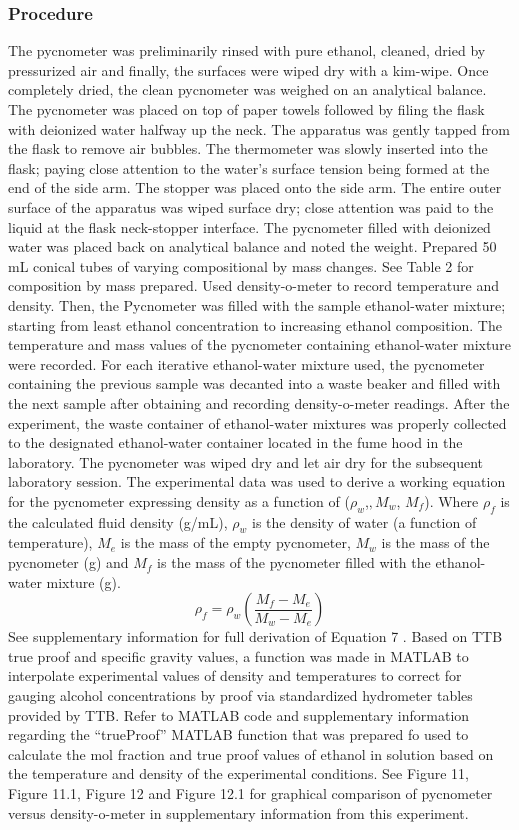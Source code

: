 \documentclass[peerreview, a4paper, 12pt]{IEEEtran}
\begin{document}
\subsubsection{\textbf{Procedure}}
The pycnometer was preliminarily rinsed with pure ethanol, cleaned, dried by pressurized air and finally, the surfaces were wiped dry with a kim-wipe. Once completely dried, the clean pycnometer was weighed on an analytical balance. The pycnometer was placed on top of paper towels followed by filing the flask with deionized water halfway up the neck. The apparatus was gently tapped from the flask to remove air bubbles. The thermometer was slowly inserted into the flask; paying close attention to the water’s surface tension being formed at the end of the side arm. The stopper was placed onto the side arm. The entire outer surface of the apparatus was wiped surface dry; close attention was paid to the liquid at the flask neck-stopper interface. The pycnometer filled with deionized water was placed back on analytical balance and noted the weight. Prepared 50 mL conical tubes of varying compositional by mass changes. See Table 2 for composition by mass prepared. Used density-o-meter to record temperature and density. Then, the Pycnometer was filled with the sample ethanol-water mixture; starting from least ethanol concentration to increasing ethanol composition. The temperature and mass values of the pycnometer containing ethanol-water mixture were recorded. For each iterative ethanol-water mixture used, the pycnometer containing the previous sample was decanted into a waste beaker and filled with the next sample after obtaining and recording density-o-meter readings. After the experiment, the waste container of ethanol-water mixtures was properly collected to the designated ethanol-water container located in the fume hood in the laboratory. The pycnometer was wiped dry and let air dry for the subsequent laboratory session. The experimental data was used to derive a working equation for the pycnometer expressing density as a function of (${\rho_w}$,$,M_w$, $M_f$). Where ${\rho_f}$ is the calculated fluid density (g/mL), ${\rho_w}$ is the density of water (a function of temperature), ${M_e}$ is the mass of the empty pycnometer, ${M_w}$ is the mass of the pycnometer (g) and ${M_f}$ is the mass of the pycnometer filled with the ethanol-water mixture (g).
\begin{equation}    
    \rho_f = \rho_w(\frac{M_f - M_e}{M_w - M_e})
\label{equation 7}
\end{equation}
See supplementary information for full derivation of Equation 7 . Based on TTB true proof and specific gravity values, a function was made in MATLAB to interpolate experimental values of density and temperatures to correct for gauging alcohol concentrations by proof via standardized hydrometer tables provided by TTB. Refer to MATLAB code and supplementary information regarding the “trueProof” MATLAB function that was prepared fo used to calculate the mol fraction and true proof values of ethanol in solution based on the temperature and density of the experimental conditions. See Figure 11, Figure 11.1, Figure 12 and Figure 12.1 for graphical comparison of pycnometer versus density-o-meter in supplementary information from this experiment.
\end{document}
